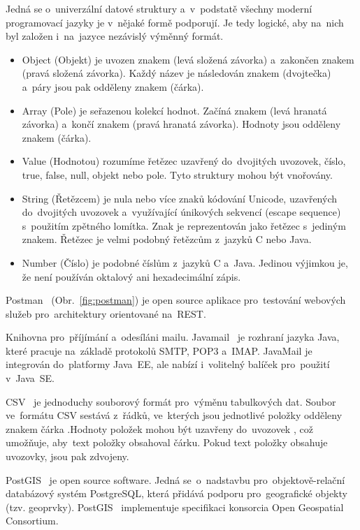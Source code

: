 Jedná se o~univerzální datové struktury a~v~podstatě všechny moderní programovací jazyky je v~nějaké formě podporují. Je tedy logické, aby na~nich byl založen i~na~jazyce nezávislý výměnný formát.
\begin{itemize}
	\item Object (Objekt) je uvozen znakem \uv{\{} (levá složená závorka) a~zakončen znakem \uv{\}} (pravá složená závorka). Každý název je následován znakem \uv{:} (dvojtečka) a~páry  jsou pak odděleny znakem \uv{,} (čárka).
	\item Array (Pole) je seřazenou kolekcí hodnot. Začíná znakem \uv{[} (levá hranatá závorka) a~končí znakem \uv{]} (pravá hranatá závorka). Hodnoty jsou odděleny znakem \uv{,} (čárka).
	\item Value (Hodnotou) rozumíme řetězec uzavřený do~dvojitých uvozovek, číslo, true, false, null, objekt nebo pole.
	Tyto struktury mohou být vnořovány.
	\item String (Řetězcem) je nula nebo více znaků kódování Unicode, uzavřených do~dvojitých uvozovek a~využívající únikových sekvencí (escape sequence) s~použitím zpětného lomítka. Znak je reprezentován jako řetězec s~jediným znakem. Řetězec je velmi podobný řetězcům z~jazyků C nebo Java.
	\item Number (Číslo) je podobné číslům z~jazyků C a~Java. Jedinou výjimkou je, že není používán oktalový ani hexadecimální zápis.
\end{itemize}

Postman~\cite{postman} (Obr.~\ref{fig:postman}) je open source aplikace pro~testování webových služeb pro~architektury orientované na~REST.


Knihovna pro~příjímání a~odesíláni mailu. Javamail~\cite{javamail} je rozhraní jazyka Java, které pracuje na~základě protokolů SMTP, POP3 a~IMAP. JavaMail je integrován do~platformy Java~EE, ale nabízí i~volitelný balíček pro~použití v~Java~SE.

CSV~\cite{csv} je jednoduchy souborový formát pro~výměnu tabulkových dat.
Soubor ve~formátu CSV sestává z~řádků, ve~kterých jsou jednotlivé položky odděleny znakem čárka \uv{,}.Hodnoty položek mohou být uzavřeny do~uvozovek , což umožňuje, aby~text položky obsahoval čárku. Pokud text položky obsahuje uvozovky, jsou pak zdvojeny.

PostGIS~\cite{postgis} je open source software. Jedná se~o~nadstavbu pro~objektově-relační databázový systém PostgreSQL, která přidává podporu pro~geografické objekty~\cite{arcgis} (tzv. geoprvky). PostGIS~\cite{postgis2} implementuje specifikaci  konsorcia Open Geospatial Consortium.



